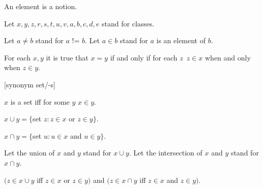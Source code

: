 \documentclass[a4paper,draft]{amsproc}
\begin{document}
\begin{forthel}

\begin{signature}[ElmSort]
An element is a notion.
\end{signature}


Let $x, y, z, r, s, t, u, v, a, b, c, d, e$ stand for classes.

Let $a \neq b$ stand for $a$ != $b$.
Let $a \in b$ stand for $a$ is an element of $b$.

\begin{axiom} For each $x, y$  
it is true that $x = y$ if and only if for each $z$\ $z \in x$ 
when and only when $z \in y$.
\end{axiom}


[synonym set/-s]

\begin{definition} 
$x$ is a set iff for some $y$ $x \in y$.
\end{definition}


\begin{definition} 
$x \cup y = \{$set $z : z \in x$ or $z \in y \}$.
\end{definition}

\begin{definition} 
$x \cap y = \{$set $u : u \in x$ and $u \in y \}$.
\end{definition}

Let the union of $x$ and $y$ stand for $x \cup y$.
Let the intersection of $x$ and $y$ stand for $x \cap y$.

\begin{theorem}
$(z \in x \cup y$ iff $z \in x$ or $z \in y)$
and $(z \in x \cap y$ iff $z \in x$ and $z \in y)$.
\end{theorem}


\end{forthel}
\end{document}
